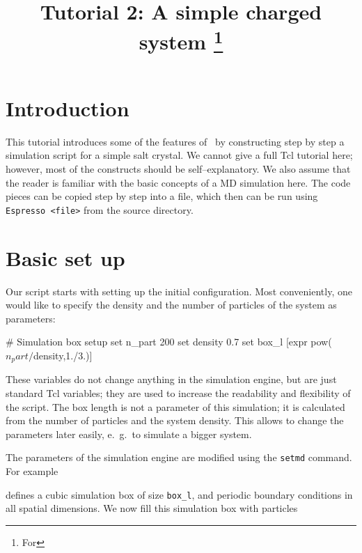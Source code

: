 \documentclass[
a4paper,                        %
11pt,                           %
twoside,                        %
footsepline,                    %
headsepline,                    %
headexclude,                    %
footexclude,                    %
pagesize,                       %
]{scrartcl}
\begin{document}
\esptitlehead
\title{Tutorial 2: A simple charged system%
\ifdefined\esversion%
\thanks{For \es \esversion}%
\fi%
}

\maketitle
\tableofcontents

\section{Introduction}

This tutorial introduces some of the features of \es\ by constructing
step by step a simulation script for a simple salt crystal.  We cannot
give a full Tcl tutorial here; however, most of the constructs should
be self--explanatory. We also assume that the reader is familiar with
the basic concepts of a MD simulation here. The code pieces can be
copied step by step into a file, which then can be run using
\verb|Espresso <file>| from the \es source directory.

\section{Basic set up}

Our script starts with setting up the initial configuration.  Most
conveniently, one would like to specify the density and the number of
particles of the system as parameters:

\begin{tclcode}
  # Simulation box setup
  set n_part 200
  set density 0.7
  set box_l [expr pow($n_part/$density,1./3.)]
\end{tclcode}

These variables do not change anything in the simulation engine, but
are just standard Tcl variables; they are used to increase the
readability and flexibility of the script. The box length is not a
parameter of this simulation; it is calculated from the number of
particles and the system density. This allows to change the parameters
later easily, e.~g.\ to simulate a bigger system.

The parameters of the simulation engine are modified using the
\verb|setmd| command. For example


defines a cubic simulation box of size \verb|box_l|, and periodic
boundary conditions in all spatial dimensions. We now fill this
simulation box with particles
\end{document}
